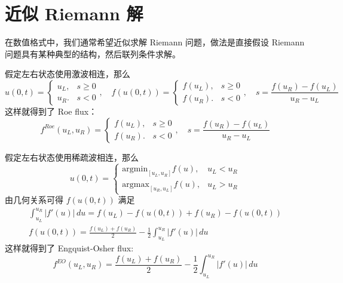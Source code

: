\section{近似 Riemann 解}

在数值格式中，我们通常希望近似求解 Riemann 问题，做法是直接假设 Riemann 问题具有某种典型的结构，然后联列条件求解。

假定左右状态使用激波相连，那么
\[
    u(0,t) =
    \begin{cases}
        u_L, & s \ge 0 \\
        u_R. & s < 0
    \end{cases},
    \quad
    f(u(0,t)) =
    \begin{cases}
        f(u_L), & s \ge 0 \\
        f(u_R). & s < 0
    \end{cases},
    \quad
    s = \frac{f(u_R)-f(u_L)}{u_R - u_L}
\]
这样就得到了 Roe flux：
\[
    f^{Roe}(u_L,u_R) =
    \begin{cases}
        f(u_L), & s \ge 0 \\
        f(u_R). & s < 0
    \end{cases},
    \quad
    s = \frac{f(u_R)-f(u_L)}{u_R - u_L}
\]

假定左右状态使用稀疏波相连，那么
\[
    u(0,t) =
    \begin{cases}
        \text{argmin}_{[u_L,u_R]} f(u), & u_L < u_R \\
        \text{argmax}_{[u_R,u_L]} f(u), & u_L > u_R
    \end{cases}
\]
由几何关系可得 $f(u(0,t))$ 满足
\begin{gather*}
    \int_{u_L}^{u_R} |f'(u)|\,du = f(u_L) - f(u(0,t)) + f(u_R) - f(u(0,t)) \\
    f(u(0,t)) = \frac{f(u_L) + f(u_R)}2 - \frac12 \int_{u_L}^{u_R} |f'(u)|\,du
\end{gather*}
这样就得到了 Engquist-Osher flux:
\[
    f^{EO}(u_L,u_R) = \frac{f(u_L) + f(u_R)}2 - \frac12 \int_{u_L}^{u_R} |f'(u)|\,du
\]

